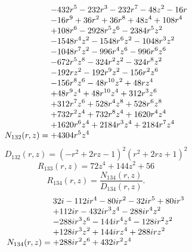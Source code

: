 \documentclass[11pt,a4paper]{article}
\begin{document}
\begin{equation}
N_{132}(r,z)=\shortstack[l]{$\displaystyle  - 432 r^{5} - 232 r^{3} - 232 r^{7} - 48 z^{2} - 16 r$\\
$\displaystyle  - 16 r^{9} + 36 r^{2} + 36 r^{8} + 48 z^{4} + 108 r^{4}$\\
$\displaystyle  + 108 r^{6} - 2928 r^{5} z^{6} - 2384 r^{5} z^{2}$\\
$\displaystyle  - 1548 r^{4} z^{2} - 1548 r^{6} z^{2} - 1048 r^{3} z^{2}$\\
$\displaystyle  - 1048 r^{7} z^{2} - 996 r^{4} z^{6} - 996 r^{6} z^{6}$\\
$\displaystyle  - 672 r^{5} z^{8} - 324 r^{2} z^{2} - 324 r^{8} z^{2}$\\
$\displaystyle  - 192 r z^{2} - 192 r^{9} z^{2} - 156 r^{2} z^{6}$\\
$\displaystyle  - 156 r^{8} z^{6} - 48 r^{10} z^{2} + 48 r z^{4}$\\
$\displaystyle  + 48 r^{9} z^{4} + 48 r^{10} z^{4} + 312 r^{3} z^{6}$\\
$\displaystyle  + 312 r^{7} z^{6} + 528 r^{4} z^{8} + 528 r^{6} z^{8}$\\
$\displaystyle  + 732 r^{2} z^{4} + 732 r^{8} z^{4} + 1620 r^{4} z^{4}$\\
$\displaystyle  + 1620 r^{6} z^{4} + 2184 r^{3} z^{4} + 2184 r^{7} z^{4}$\\
$\displaystyle  + 4304 r^{5} z^{4}$}
\label{eq:cat-numerator-132}
\end{equation}
\begin{equation}
D_{132}(r,z)=\left(- r^{2} + 2 r z - 1\right)^{2} \left(r^{2} + 2 r z + 1\right)^{2}
\label{eq:cat-denominator-132}
\end{equation}
\begin{equation}
R_{133}(r,z)=72 z^{4} + 144 z^{2} + 56
\label{eq:cat-rational-133}
\end{equation}
\begin{equation}
R_{134}(r,z)=\frac{N_{134}(r,z)}{D_{134}(r,z)}.
\label{eq:cat-rational-134}
\end{equation}
\begin{equation}
N_{134}(r,z)=\shortstack[l]{$\displaystyle 32 i - 112 i r^{4} - 80 i r^{2} - 32 i r^{5} + 80 i r^{3}$\\
$\displaystyle  + 112 i r - 432 i r^{3} z^{4} - 288 i r^{4} z^{2}$\\
$\displaystyle  - 288 i r^{3} z^{6} - 144 i r^{4} z^{4} - 128 i r^{2} z^{2}$\\
$\displaystyle  + 128 i r^{3} z^{2} + 144 i r z^{4} + 288 i r z^{2}$\\
$\displaystyle  + 288 i r^{2} z^{6} + 432 i r^{2} z^{4}$}
\label{eq:cat-numerator-134}
\end{equation}
\end{document}
